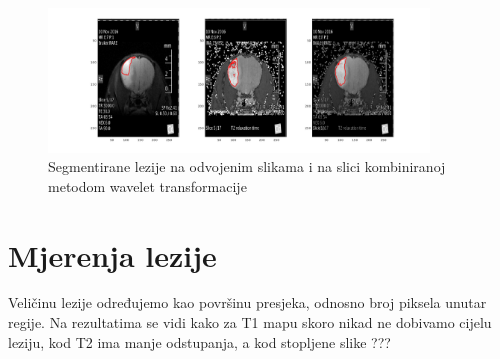 \documentclass[lmodern, utf8, seminar]{fer}
\begin{document}
\begin{figure}[H]
	\centering
	\includegraphics[width=0.9\textwidth]{results}
	\caption{Segmentirane lezije na odvojenim slikama i na slici kombiniranoj metodom wavelet transformacije}
	\label{fig:results}
\end{figure}

\section{Mjerenja lezije}
Veličinu lezije određujemo kao površinu presjeka, odnosno broj piksela unutar regije. Na rezultatima se vidi kako za T1 mapu skoro nikad ne dobivamo cijelu leziju, kod T2 ima manje odstupanja, a kod stopljene slike ???

% 
\end{document}
